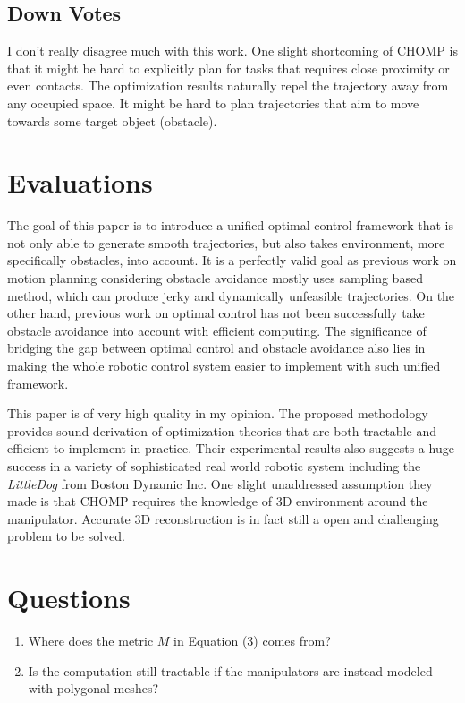 \documentclass[10pt, twocolumn]{article}
\begin{document}
\subsection{Down Votes}
I don't really disagree much with this work. One slight shortcoming of CHOMP
is that it might be hard to explicitly plan for tasks that requires close
proximity or even contacts. The optimization results naturally repel the trajectory
away from any occupied space. It might be hard to plan trajectories that
aim to move towards some target object (obstacle).

\section{Evaluations}
The goal of this paper is to introduce a unified optimal control framework
that is not only able to generate smooth trajectories, but also takes
environment, more specifically obstacles, into account. It is a perfectly valid goal
as previous work on motion planning considering obstacle avoidance mostly
uses sampling based method, which can produce jerky and dynamically unfeasible
trajectories. On the other hand, previous work on optimal control has not been
successfully take obstacle avoidance into account with efficient computing.
The significance of bridging the gap between optimal control and obstacle avoidance
also lies in making the whole robotic control system easier to implement
with such unified framework.

This paper is of very high quality in my opinion. The proposed methodology
provides sound derivation of optimization theories that are both tractable
and efficient to implement in practice. Their experimental results also
suggests a huge success in a variety of sophisticated real world robotic
system including the \textit{LittleDog} from Boston Dynamic Inc. One slight
unaddressed assumption they made is that CHOMP requires the knowledge of
3D environment around the manipulator. Accurate 3D reconstruction is in fact
still a open and challenging problem to be solved.

\section{Questions}
\begin{enumerate}
  \item Where does the metric $M$ in Equation (3) comes from?
  \item Is the computation still tractable if the manipulators are instead
    modeled with polygonal meshes?
\end{enumerate}
\end{document}
